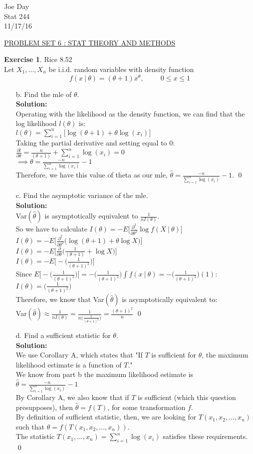 \documentclass[11pt]{article}
\theoremstyle{definition}
\newtheorem{exercise}[theorem]{Exercise}
\newcommand{\st}{\ |\ }
\newcommand{\V}{\vspace{0.3cm}\\}
\newcommand{\sol}{\V \textbf{Solution:} \V}
\begin{document}
\begin{flushright}
Joe Day\\
Stat 244\\
11/17/16
\end{flushright}
\begin{center}
\underline{PROBLEM SET 6 : STAT THEORY AND METHODS}
\end{center}

\begin{exercise} Rice 8.52\\
Let $X_1,...,X_n$ be i.i.d. random variables with density function
$$f(x \st \theta) = (\theta + 1)x^\theta, \hspace{1cm} 0 \leq x \leq 1 $$
\begin{enumerate}
\item[b.] Find the mle of $\theta$. \sol
Operating with the likelihood as the density function, we can find that the log likelihood $l(\theta)$ is:\V
$l(\theta) = \sum_{i=1}^n \big[\log(\theta+1) + \theta \log(x_i) \big]$ \V
Taking the partial derivative and setting equal to 0: \V
$\displaystyle \frac{\partial l}{\partial \theta} = \frac{n}{(\theta+1)} + \sum_{i=1}^n \log(x_i) = 0$ \V
$\implies \displaystyle \theta = \frac{-n}{\sum_{i=1}^n \log(x_i)} - 1$ \V
Therefore, we have  this value of theta as our mle, $\hat{\theta} = \displaystyle \frac{-n}{\sum_{i=1}^n \log(x_i)} - 1$. \qed \newpage
\item[c.] Find the asymptotic variance of the mle. \sol
Var$(\hat{\theta})$ is asymptotically equivalent to $\frac{1}{nI(\theta)}$. \V
So we have to calculate $I(\theta) = -E \bigg[\frac{\partial^2}{\partial \theta^2} \log f(X \st \theta) \bigg]$ \V
$I(\theta) = -E \bigg[\frac{\partial^2}{\partial \theta^2} \big(\log (\theta+1) + \theta \log X \big)  \bigg]$ \V
 $I(\theta) = -E \bigg[\frac{\partial}{\partial \theta} \big(\frac{1}{(\theta+1)} + \log X \big)  \bigg]$ \V
  $I(\theta) = -E \bigg[ -\big(\frac{1}{(\theta+1)^2}\big)  \bigg]$ \V
 Since $E \bigg[ -\big(\frac{1}{(\theta+1)^2}\big)  \bigg] = -\big(\frac{1}{(\theta+1)^2}\big) \int f(x \st \theta) = -\big(\frac{1}{(\theta+1)^2}\big) (1)$: \V
  $I(\theta) = \big(\frac{1}{(\theta+1)^2}\big)$ \V
  Therefore, we know that Var$(\hat{\theta})$ is asymptotically equivalent to: \V
  Var$(\hat{\theta}) \approx \displaystyle \frac{1}{nI(\theta)} = \frac{1}{n \big(\frac{1}{(\theta+1)^2}\big)} = \displaystyle \frac{(\theta+1)^2}{n} $ \qed 
  
\item[d.] Find a sufficient statistic for $\theta$. \sol
We use Corollary A, which states that "If $T$ is sufficient for $\theta$, the maximum likelihood estimate is a function of $T$." \V
We know from part b the maximum likelihood estimate is $\hat{\theta} = \displaystyle \frac{-n}{\sum_{i=1}^n \log(x_i)} - 1$ \V
By Corollary A, we also know that if $T$ is sufficient (which this question presupposes), then $\hat{\theta} = f(T)$, for some transformation $f$. \V
By definition of sufficient statistic, then, we are looking for $T(x_1, x_2,...,x_n)$ such that $\hat{\theta} = f(T(x_1,x_2,...,x_n))$. \V
The statistic $T(x_1, ...,x_n) = \sum_{i=1}^n \log(x_i)$ satisfies these requirements. \qed \newpage
\end{enumerate}
\end{exercise}
\end{document}
